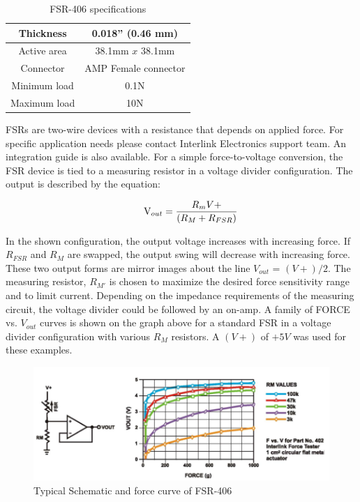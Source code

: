 \documentclass[conference]{IEEEtran}
\begin{document}
 \begin{table}[h]
{\renewcommand\arraystretch{1.25}
\caption{FSR-406 specifications}
\begin{tabular}{|c|cc}  \hline\hline
Thickness& \multicolumn{2}{p{6cm}|}{\raggedright 0.018'' (0.46 mm)} \\ \hline
Active area& \multicolumn{2}{p{6cm}|}{\raggedright 38.1mm $x$ 38.1mm} \\ \hline
Connector& \multicolumn{2}{p{6cm}|}{\raggedright AMP Female connector} \\ \hline
Minimum load& \multicolumn{2}{p{6cm}|}{\raggedright 0.1N} \\ \hline
Maximum load& \multicolumn{2}{p{6cm}|}{\raggedright 10N} \\ \hline \hline
\end{tabular}}
\end{table}



FSRs are two-wire devices with a resistance that depends on applied force. For specific application needs please contact Interlink Electronics support team. An integration guide is also available. For a simple force-to-voltage conversion, the FSR device is tied to a measuring resistor in a voltage divider configuration. The output is described by the equation:


\begin{displaymath}
\qquad\mathrm{V}_{out} =\frac{{R}_mV+}{({R}_M+{R}_{FSR})}\\
\end{displaymath}

In the shown configuration, the output voltage increases with increasing force. If ${R}_{FSR}$ and ${R}_{M}$ are swapped, the output swing will decrease with increasing force. These two output forms are mirror images about the line ${V}_{out}$  = $(V+) / 2$. The measuring resistor, ${R}_{M'}$ is chosen to maximize the desired force sensitivity range and to limit current. Depending on the impedance requirements of the measuring circuit, the voltage divider could be followed by an on-amp. A family of FORCE vs. ${V}_{out}$ curves is shown on the graph above for a standard FSR in a voltage divider configuration with various ${R}_{M}$ resistors. A $(V+)$ of $+5V$ was used for these examples.

\begin{figure}[htbp]
\begin{center}
    \includegraphics[scale=0.375]{img_07.png}
    \caption{Typical Schematic and force curve of FSR-406} 
\end{center}
\end{figure}
\end{document}
